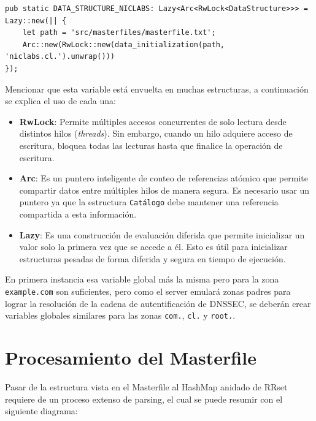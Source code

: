 \begin{lstlisting}
pub static DATA_STRUCTURE_NICLABS: Lazy<Arc<RwLock<DataStructure>>> = Lazy::new(|| {
    let path = 'src/masterfiles/masterfile.txt';
    Arc::new(RwLock::new(data_initialization(path, 'niclabs.cl.').unwrap()))
});
\end{lstlisting}

Mencionar que esta variable está envuelta en muchas estructuras, a continuación se explica el uso de cada una:

\begin{itemize}
    \item \textbf{RwLock}: Permite múltiples accesos concurrentes de solo lectura desde distintos hilos (\textit{threads}). Sin embargo, cuando un hilo adquiere acceso de escritura, bloquea todas las lecturas hasta que finalice la operación de escritura.

    \item \textbf{Arc}: Es un puntero inteligente de conteo de referencias atómico que permite compartir datos entre múltiples hilos de manera segura. Es necesario usar un puntero ya que la estructura \texttt{Catálogo} debe mantener una referencia compartida a esta información.

    \item \textbf{Lazy}: Es una construcción de evaluación diferida que permite inicializar un valor solo la primera vez que se accede a él. Esto es útil para inicializar estructuras pesadas de forma diferida y segura en tiempo de ejecución.
\end{itemize}

En primera instancia esa variable global más la misma pero para la zona \texttt{example.com} son suficientes, pero como el server emulará zonas padres para lograr la resolución
de la cadena de autentificación de DNSSEC, se deberán crear variables globales similares para las zonas \texttt{com.}, \texttt{cl.} y \texttt{root.}.

\section{Procesamiento del Masterfile}

Pasar de la estructura vista en el Masterfile al HashMap anidado de RRset requiere de un proceso extenso de parsing, el cual se puede resumir con el siguiente diagrama:


